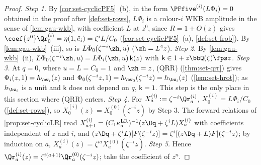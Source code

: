 \begin{proof}
\emph{Step 1.} By \cref{cor:set-cyclicPF5}~(b), in the form $\PFfive^{(i)}(L\Phi_i)=0$ obtained in the proof after \cref{def:set-rows}, $L\Phi_i$ is a colour-$i$ WKB amplitude in the sense of \cref{lem:gau-wkb}, with coefficient $L$ at $z^0$, since $R=1+O(z)$ gives $\coef{z^0}\Qr^{(i)}_0=\eta(1,\tilde e_i)=\zeta^iL/C_0$ (\cref{cor:set-cyclicPF5}~(a), \cref{def:set-frob}). By \cref{lem:gau-wkb}~(iii), so is $L\Phi_0(\zeta^{-i}\zh,u)$ ($\zh=L^4z$). \emph{Step 2.} By \cref{lem:gau-wkb}~(ii), $L\Phi_0(\zeta^{-i}\zh,u)=L\Phi_i(\zh,u)\,\mathsf k(z)$ with $\mathsf k\in1+z\bbQ(\zeta)\fps z$. \emph{Step 3.} At $q=0$, where $u=L=C_0=1$ and $\zh=z$, (QRR) (\cref{thm:set-qrr}) gives $\Phi_i(z,1)=h_{\bw_i}(z)$ and $\Phi_0(\zeta^{-i}z,1)=h_{\bw_0}(\zeta^{-i}z)=h_{\bw_i}(z)$ (\cref{lem:set-hrot}); as $h_{\bw_i}$ is a unit and $\mathsf k$ does not depend on $q$, $\mathsf k=1$. This step is the only place in this section where (QRR) enters. \emph{Step 4.} For $X^{(i)}_a:=\zeta^{-i}\Qr^{(i)}_a$, $X^{(i)}_0=L\Phi_i/C_0$ (\cref{def:set-rows}), so $X^{(i)}_0(z)=X^{(0)}_0(\zeta^{-i}z)$ by Step 3. The forward relations of \cref{prop:set-cyclicLR} read $X^{(i)}_{a+1}=(C_1\kappa^{\mathrm{LR}}_a)^{-1}(z\Dq+\zeta^iL)X^{(i)}_a$ with coefficients independent of $z$ and $i$, and $(z\Dq+\zeta^iL)[F(\zeta^{-i}z)]=\zeta^i[(z\Dq+L)F](\zeta^{-i}z)$; by induction on $a$, $X^{(i)}_a(z)=\zeta^{ia}X^{(0)}_a(\zeta^{-i}z)$. \emph{Step 5.} Hence $\Qr^{(i)}_a(z)=\zeta^{i(a+1)}\Qr^{(0)}_a(\zeta^{-i}z)$; take the coefficient of $z^n$.
\end{proof}


